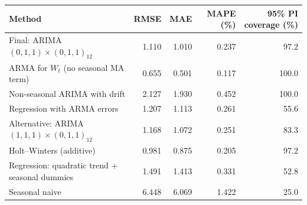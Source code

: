 \begin{tabular}{lrrrr}
\toprule
Method & RMSE & MAE & MAPE (\%) & 95\% PI coverage (\%)\\
\midrule
Final: ARIMA$(0,1,1)\times(0,1,1)_{12}$ & 1.110 & 1.010 & 0.237 & 97.2\\
ARMA for $W_t$ (no seasonal MA term) & 0.655 & 0.501 & 0.117 & 100.0\\
Non-seasonal ARIMA with drift & 2.127 & 1.930 & 0.452 & 100.0\\
Regression with ARMA errors & 1.207 & 1.113 & 0.261 & 55.6\\
Alternative: ARIMA$(1,1,1)\times(0,1,1)_{12}$ & 1.168 & 1.072 & 0.251 & 83.3\\
Holt--Winters (additive) & 0.981 & 0.875 & 0.205 & 97.2\\
Regression: quadratic trend + seasonal dummies & 1.491 & 1.413 & 0.331 & 52.8\\
Seasonal naive & 6.448 & 6.069 & 1.422 & 25.0\\
\bottomrule
\end{tabular}
